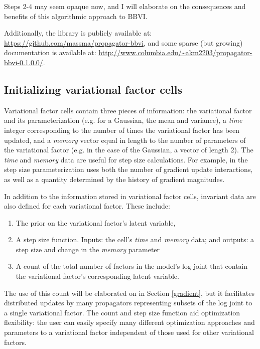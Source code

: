 \documentclass[12pt]{article}
\begin{document}
Steps 2-4 may seem opaque now, and I will elaborate on the
consequences and benefits of this algorithmic approach to BBVI.

Additionally, the library is publicly available at:
\url{https://github.com/massma/propagator-bbvi}, and some sparse (but
growing) documentation is available at:
\url{http://www.columbia.edu/~akm2203/propagator-bbvi-0.1.0.0/}.

\subsection{Initializing variational factor cells}

Variational factor cells contain three pieces of information: the
variational factor and its parameterization (e.g. for a Gaussian, the
mean and variance), a \textit{time} integer corresponding to the
number of times the variational factor has been updated, and a
\textit{memory} vector equal in length to the number of parameters of
the variational factor (e.g. in the case of the Gaussian, a vector of
length 2). The \textit{time} and \textit{memory} data are useful
for step size calculations. For example, in \citet{kuc-2017} the step
size parameterization uses both the number of gradient update
interactions, as well as a quantity determined by the history of
gradient magnitudes.

In addition to the information stored in variational factor cells,
invariant data are also defined for each variational factor. These
include:

\begin{enumerate}
  \item The prior on the variational factor's latent variable,
  \item A step size function. Inputs: the cell's \textit{time} and
    \textit{memory} data; and outputs: a step size and change in the
    \textit{memory} parameter
  \item A count of the total number of factors in the model's log
    joint that contain the variational factor's corresponding latent
    variable.
\end{enumerate}

The use of this count will be elaborated on in Section \ref{gradient},
but it facilitates distributed updates by many propagators
representing subsets of the log joint to a single variational
factor. The count and step size function aid optimization flexibility:
the user can easily specify many different optimization approaches
and parameters to a variational factor independent of those used
for other variational factors.
\end{document}
